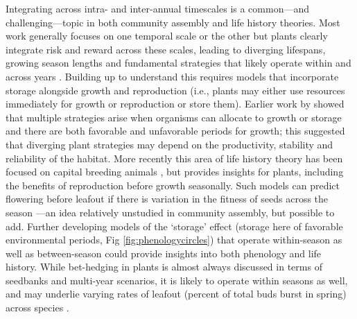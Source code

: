 \documentclass[11pt]{article}
\newcommand{\R}[1]{\label{}\linelabel{#1}}
\begin{document}
Integrating across intra- and inter-annual timescales is a common---and challenging---topic in both community assembly and life history theories. Most work generally focuses on one temporal scale or the other but plants clearly integrate risk and reward across these scales, leading to diverging lifespans, growing season lengths and fundamental strategies that likely operate within and across years \citep{bazzaz1987allocating}. Building up to understand this requires models that incorporate storage alongside growth and reproduction \R{realstorageS}(i.e., plants may either use resources immediately for growth or reproduction or store them).\R{realstorageE} Earlier work by \citet{iwasa1989optimal} showed that multiple strategies arise when organisms can allocate to growth or storage and there are both favorable and unfavorable periods for growth; this suggested that diverging plant strategies may depend on the productivity, stability and reliability of the habitat. More recently this area of life history theory has been focused on capital breeding animals \citep[e.g.,][]{varpe2009adaptive}, but provides insights for plants, including the benefits of reproduction before growth seasonally. Such models can predict flowering before leafout if there is variation in the fitness of seeds across the season \citep{ejsmond2010time}---an idea relatively unstudied in community assembly, but possible to add. Further developing models of the `storage' effect (storage here of favorable environmental periods, Fig \ref{fig:phenologycircles}) that operate within-season as well as between-season could provide insights into both phenology and life history. While bet-hedging in plants is almost always discussed in terms of seedbanks and multi-year scenarios, it is likely to operate within seasons as well, and may underlie varying rates of leafout (percent of total buds burst in spring) across species \citep{baumgarten2021chilled}. 
\end{document}
